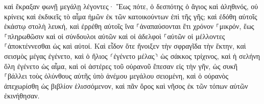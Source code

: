 \documentclass{openreader}
\begin{document}
καὶ ἔκραξαν φωνῇ μεγάλῃ λέγοντες· Ἕως πότε, ὁ δεσπότης ὁ ἅγιος καὶ ἀληθινός, οὐ κρίνεις καὶ ἐκδικεῖς τὸ αἷμα ἡμῶν ἐκ τῶν κατοικούντων ἐπὶ τῆς γῆς; 
καὶ ἐδόθη αὐτοῖς ἑκάστῳ στολὴ λευκή, καὶ ἐρρέθη αὐτοῖς ἵνα ⸀ἀναπαύσονται ἔτι χρόνον ⸀μικρόν, ἕως ⸀πληρωθῶσιν καὶ οἱ σύνδουλοι αὐτῶν καὶ οἱ ἀδελφοὶ ⸀αὐτῶν οἱ μέλλοντες ⸀ἀποκτέννεσθαι ὡς καὶ αὐτοί. 
Καὶ εἶδον ὅτε ἤνοιξεν τὴν σφραγῖδα τὴν ἕκτην, καὶ σεισμὸς μέγας ἐγένετο, καὶ ὁ ἥλιος ⸂ἐγένετο μέλας⸃ ὡς σάκκος τρίχινος, καὶ ἡ σελήνη ὅλη ἐγένετο ὡς αἷμα, 
καὶ οἱ ἀστέρες τοῦ οὐρανοῦ ἔπεσαν εἰς τὴν γῆν, ὡς συκῆ ⸀βάλλει τοὺς ὀλύνθους αὐτῆς ὑπὸ ἀνέμου μεγάλου σειομένη, 
καὶ ὁ οὐρανὸς ἀπεχωρίσθη ὡς βιβλίον ἑλισσόμενον, καὶ πᾶν ὄρος καὶ νῆσος ἐκ τῶν τόπων αὐτῶν ἐκινήθησαν. 
\end{document}
